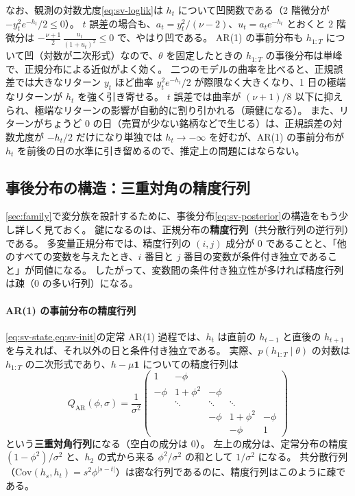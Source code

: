 なお、観測の対数尤度\cref{eq:sv-loglik}は $h_t$ について凹関数である（2 階微分が $-y_t^2 e^{-h_t}/2 \leq 0$）。
$t$ 誤差の場合も、$a_t = y_t^2/(\nu-2)$、$u_t = a_t e^{-h_t}$ とおくと 2 階微分は $-\frac{\nu+1}{2}\,\frac{u_t}{(1+u_t)^2} \leq 0$ で、やはり凹である。
AR(1) の事前分布も $h_{1:T}$ について凹（対数が二次形式）なので、$\theta$ を固定したときの $h_{1:T}$ の事後分布は単峰で、正規分布による近似がよく効く。
二つのモデルの曲率を比べると、正規誤差では大きなリターン $y_t$ ほど曲率 $y_t^2 e^{-h_t}/2$ が際限なく大きくなり、1 日の極端なリターンが $h_t$ を強く引き寄せる。
$t$ 誤差では曲率が $(\nu+1)/8$ 以下に抑えられ、極端なリターンの影響が自動的に割り引かれる（頑健になる）。
また、リターンがちょうど 0 の日（売買が少ない銘柄などで生じる）は、正規誤差の対数尤度が $-h_t/2$ だけになり単独では $h_t \to -\infty$ を好むが、AR(1) の事前分布が $h_t$ を前後の日の水準に引き留めるので、推定上の問題にはならない。

\subsection{事後分布の構造：三重対角の精度行列}\label{sec:model-structure}

\cref{sec:family}で変分族を設計するために、事後分布\cref{eq:sv-posterior}の構造をもう少し詳しく見ておく。
鍵になるのは、正規分布の\textbf{精度行列}（共分散行列の逆行列）である。
多変量正規分布では、精度行列の $(i, j)$ 成分が 0 であることと、「他のすべての変数を与えたとき、$i$ 番目と $j$ 番目の変数が条件付き独立であること」が同値になる。
したがって、変数間の条件付き独立性が多ければ精度行列は疎（0 の多い行列）になる。

\paragraph{AR(1) の事前分布の精度行列}
\cref{eq:sv-state,eq:sv-init}の定常 AR(1) 過程では、$h_t$ は直前の $h_{t-1}$ と直後の $h_{t+1}$ を与えれば、それ以外の日と条件付き独立である。
実際、$p(h_{1:T} \mid \theta)$ の対数は $h_{1:T}$ の二次形式であり、$h - \mu\mathbf{1}$ についての精度行列は
\begin{equation}
  Q_{\mathrm{AR}}(\phi, \sigma) = \frac{1}{\sigma^2}
  \begin{pmatrix}
    1      & -\phi    &        &        &        \\
    -\phi  & 1+\phi^2 & -\phi  &        &        \\
           & \ddots   & \ddots & \ddots &        \\
           &          & -\phi  & 1+\phi^2 & -\phi \\
           &          &        & -\phi  & 1
  \end{pmatrix}
  \label{eq:ar1-precision}
\end{equation}
という\textbf{三重対角行列}になる（空白の成分は 0）。
左上の成分は、定常分布の精度 $(1-\phi^2)/\sigma^2$ と、$h_2$ の式から来る $\phi^2/\sigma^2$ の和として $1/\sigma^2$ になる。
共分散行列（$\mathrm{Cov}(h_s, h_t) = s^2 \phi^{|s-t|}$）は密な行列であるのに、精度行列はこのように疎である。

